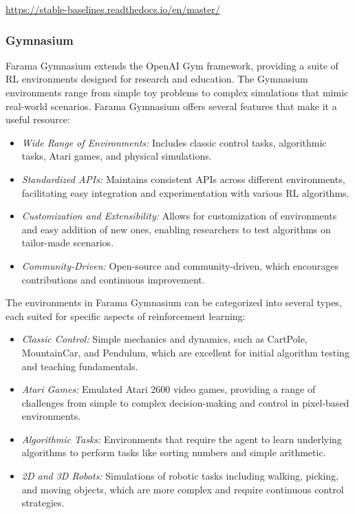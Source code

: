 \begin{withcode}
\begin{resourcebox}
\vspace{\baselineskip}

\small
\url{https://stable-baselines.readthedocs.io/en/master/}
\normalsize

\vspace{\baselineskip}
\end{resourcebox}

\subsubsection*{Gymnasium}

Farama Gymnasium extends the OpenAI Gym framework, providing a suite of RL environments designed for research and education. The Gymnasium environments range from simple toy problems to complex simulations that mimic real-world scenarios. Farama Gymnasium offers several features that make it a useful resource:

\begin{itemize}
\item \emph{Wide Range of Environments:} Includes classic control tasks, algorithmic tasks, Atari games, and physical simulations.
\item \emph{Standardized APIs:} Maintains consistent APIs across different environments, facilitating easy integration and experimentation with various RL algorithms.
\item \emph{Customization and Extensibility:} Allows for customization of environments and easy addition of new ones, enabling researchers to test algorithms on tailor-made scenarios.
\item \emph{Community-Driven:} Open-source and community-driven, which encourages contributions and continuous improvement.
\end{itemize}

The environments in Farama Gymnasium can be categorized into several types, each suited for specific aspects of reinforcement learning:

\begin{itemize}
\item \emph{Classic Control:} Simple mechanics and dynamics, such as CartPole, MountainCar, and Pendulum, which are excellent for initial algorithm testing and teaching fundamentals.
\item \emph{Atari Games:} Emulated Atari 2600 video games, providing a range of challenges from simple to complex decision-making and control in pixel-based environments.
\item \emph{Algorithmic Tasks:} Environments that require the agent to learn underlying algorithms to perform tasks like sorting numbers and simple arithmetic.
\item \emph{2D and 3D Robots:} Simulations of robotic tasks including walking, picking, and moving objects, which are more complex and require continuous control strategies.
\end{itemize}


\end{withcode}
